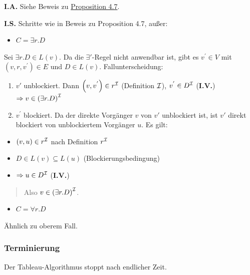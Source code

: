 \textbf{I.A.} Siehe Beweis zu
\protect\hyperlink{proposition-4.7-korrektheit}{Proposition 4.7}.

\textbf{I.S.} Schritte wie in Beweis zu Proposition 4.7, außer:

\begin{itemize}
\item
  $C = \exists r.D$
\end{itemize}

Sei $\exists r.D \in L\left( v \right)$. Da die $\exists'$-Regel
nicht anwendbar ist, gibt es $v^{'} \in V$ mit
$\left( v,r,v^{'} \right) \in E$ und $D \in L\left( v \right)$.
Fallunterscheidung:

\begin{enumerate}
\def\labelenumi{\arabic{enumi}.}
\item
  $v'$ unblockiert. Dann $\left( v,v^{'} \right) \in r^{\mathcal{I}}$
  (Definition $\mathcal{I}$), $v^{'} \in D^{\mathcal{I}}$ (\textbf{I.V.})
  $\Rightarrow v \in \left( \exists r.D \right)^{\mathcal{I}}$
\item
  $v^{'}$ blockiert. Da der direkte Vorgänger $v$ von $v'$
  unblockiert ist, ist $v'$ direkt blockiert von unblockiertem
  Vorgänger $u$. Es gilt:
\end{enumerate}

\begin{itemize}
\item
  $\left( v,u \right) \in r^{\mathcal{I}}$ nach Definition $r^{\mathcal{I}}$
\item
  $D \in L\left( v \right) \subseteq L\left( u \right)$
  (Blockierungsbedingung)
\item
  $\Rightarrow u \in D^{\mathcal{I}}$ (\textbf{I.V.})
\end{itemize}

\begin{quote}
Also $v \in \left( \exists r.D \right)^{\mathcal{I}}$.
\end{quote}

\begin{itemize}
\item
  $C = \forall r.D$
\end{itemize}

Ähnlich zu oberem Fall.

\subsubsection{Terminierung}\label{terminierung}

\begin{proposition}
Der Tableau-Algorithmus stoppt nach endlicher Zeit.
\end{proposition}

